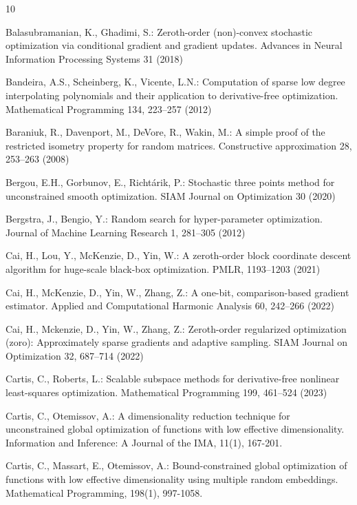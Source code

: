 \begin{thebibliography}{10}

 Balasubramanian, K., Ghadimi, S.: Zeroth-order (non)-convex stochastic optimization via conditional gradient and gradient updates. Advances in Neural Information Processing Systems 31 (2018)

Bandeira, A.S., Scheinberg, K., Vicente, L.N.: Computation of sparse low degree interpolating polynomials and their application to derivative-free optimization. Mathematical Programming 134, 223--257 (2012)

 Baraniuk, R., Davenport, M., DeVore, R., Wakin, M.: A simple proof of the restricted isometry property for random matrices. Constructive approximation 28, 253--263 (2008)

Bergou, E.H., Gorbunov, E., Richt\'arik, P.: Stochastic three points method for unconstrained smooth optimization. SIAM Journal on Optimization 30 (2020)

 Bergstra, J., Bengio, Y.: Random search for hyper-parameter optimization. Journal of Machine Learning Research 1, 281--305 (2012)

 Cai, H., Lou, Y., McKenzie, D., Yin, W.: A zeroth-order block coordinate descent algorithm for huge-scale black-box optimization. PMLR, 1193--1203 (2021)

 Cai, H., McKenzie, D., Yin, W., Zhang, Z.: A one-bit, comparison-based gradient estimator. Applied and Computational Harmonic Analysis 60, 242--266 (2022)

 Cai, H., Mckenzie, D., Yin, W., Zhang, Z.: Zeroth-order regularized optimization (zoro): Approximately sparse gradients and adaptive sampling. SIAM Journal on Optimization 32, 687--714 (2022)

Cartis, C., Roberts, L.: Scalable subspace methods for derivative-free nonlinear least-squares optimization. Mathematical Programming 199, 461--524 (2023)

Cartis, C., Otemissov, A.: A dimensionality reduction technique for unconstrained global optimization of functions with low effective dimensionality. Information and Inference: A Journal of the IMA, 11(1), 167-201.

Cartis, C., Massart, E., Otemissov, A.: Bound-constrained global optimization of functions with low effective dimensionality using multiple random embeddings. Mathematical Programming, 198(1), 997-1058.


\end{thebibliography}
